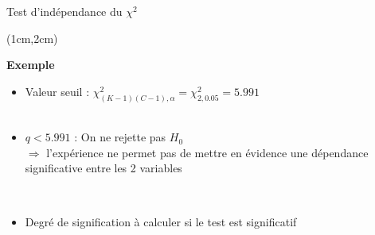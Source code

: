 \documentclass{beamer}
\begin{document}
\begin{frame}{Test d'indépendance du $\chi^2$}
\begin{textblock*}{\textwidth}(1cm,2cm)

\begin{center}{\bf \Large Exemple} \end{center}

\small 
\begin{itemize}
\item Valeur seuil : $\chi^2_{(K-1)(C-1),\alpha} = \chi^2_{2,0.05} = 5.991$ \\

\

\item $q<5.991$ : On ne rejette pas $H_0$ \\
$\Rightarrow$ l'expérience ne permet pas de mettre en évidence une dépendance significative entre les 2 variables

\

\item Degré de signification à calculer si le test est significatif
\end{itemize}


\end{textblock*}

\end{frame}

\end{document}
